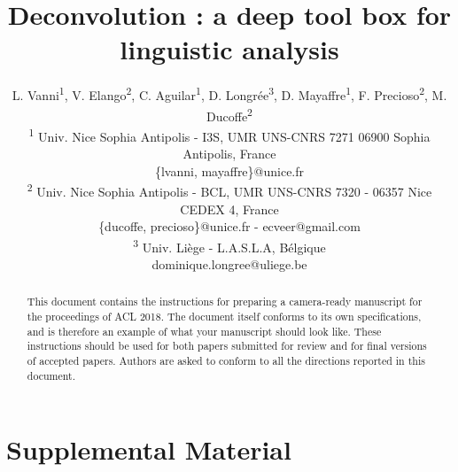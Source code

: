 \documentclass[11pt,a4paper]{article}
\title{Deconvolution : a deep tool box for linguistic analysis}
\author{
L. Vanni\textsuperscript{1}, V. Elango\textsuperscript{2}, C. Aguilar\textsuperscript{1}, D. Longrée\textsuperscript{3}, D. Mayaffre\textsuperscript{1}, F. Precioso\textsuperscript{2}, M. Ducoffe\textsuperscript{2}\\
  \textsuperscript{1} Univ. Nice Sophia Antipolis - I3S, UMR UNS-CNRS 7271 06900 Sophia Antipolis, France \\
  \{lvanni, mayaffre\}@unice.fr \\
  \textsuperscript{2} Univ. Nice Sophia Antipolis - BCL, UMR UNS-CNRS 7320 - 06357 Nice CEDEX 4, France \\
  \{ducoffe, precioso\}@unice.fr - ecveer@gmail.com \\
  \textsuperscript{3} Univ. Liège - L.A.S.L.A, Bélgique \\
  dominique.longree@uliege.be\\}
\date{}
\begin{document}
\maketitle
\begin{abstract}
  This document contains the instructions for preparing a camera-ready
  manuscript for the proceedings of ACL 2018. The document itself
  conforms to its own specifications, and is therefore an example of
  what your manuscript should look like. These instructions should be
  used for both papers submitted for review and for final versions of
  accepted papers.  Authors are asked to conform to all the directions
  reported in this document.
\end{abstract}











%
%

\appendix

\section{Supplemental Material}
\label{sec:supplemental}
\end{document}
